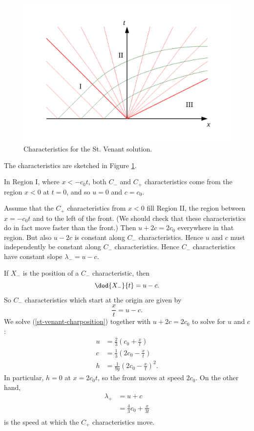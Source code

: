 \begin{figure}
\begin{center}
\includegraphics[width=16cm]{st-venant.pdf}
\caption{Characteristics for the St. Venant solution.}
\label{fig:st-venant-chars}
\end{center}
\end{figure}
The characteristics are sketched in Figure \ref{fig:st-venant-chars}.

In Region I, where $x < -c_0 t$, both $C_-$ and $C_+$ characteristics come from the region $x<0$ at $t=0$, and so $u=0$ and $c=c_0$. 

Assume that the $C_+$ characteristics from $x<0$ fill Region II, the region between $x=-c_0 t$ and to the left of the front. (We should check that these characteristics do in fact move faster than the front.) Then $u+2c = 2c_0$ everywhere in that region. But also $u-2c$ is constant along $C_-$ characteristics. Hence $u$ and $c$ must independently be constant along $C_-$ characteristics. Hence $C_-$ characteristics have constant slope $\lambda_- = u - c$. 

If $X_-$ is the position of a $C_-$ characteristic, then 
\begin{equation}
	\dod{X_-}{t} = u-c.
\end{equation}
So $C_-$ characteristics which start at the origin are given by
\begin{equation}
	\frac{x}{t} = u-c.
	\label{st-venant-charposition}
\end{equation}
We solve (\ref{st-venant-charposition}) together with $u+2c=2c_0$ to solve for $u$ and $c$:
\begin{align}
	u &= \frac{2}{3} \left(c_0 + \frac{x}{t}\right) \\
	c &= \frac{1}{3} \left(2c_0 - \frac{x}{t}\right) \\
	h &= \frac{1}{9g} \left(2c_0 - \frac{x}{t}\right)^2.
\end{align}
In particular, $h = 0$ at $x = 2c_0 t$, so the front moves at speed $2c_0$. On the other hand,
\begin{align}
	\lambda_+ &= u+c \\
			&= \frac{4}{3}c_0 + \frac{x}{3t} \\
\end{align}
is the speed at which the $C_+$ characteristics move.

